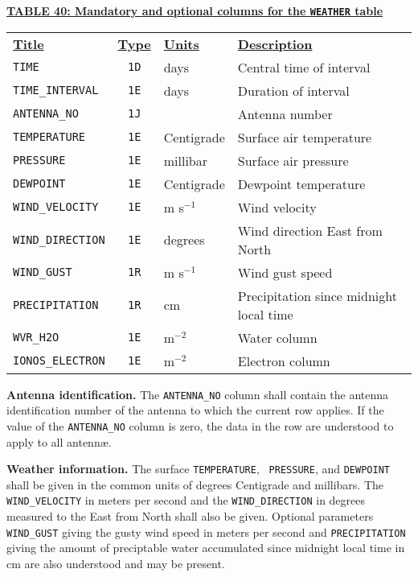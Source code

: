 \documentclass[twoside]{article}
\newcommand{\Me}[1]{\textcolor{mecol}{#1}}
\begin{document}
\begin{center}
\underline{\bf{TABLE 40: Mandatory \Me{and optional} columns for the
    {\tt WEATHER} table}}\\
\begin{tabular}{lcll}
\noalign{\vspace{2pt}}
\underline{{\bf Title\vphantom{y}}} & \underline{\bf{Type}} &
   \underline{{\bf Units\vphantom{y}}} & \underline{\bf{Description}} \\
\noalign{\vspace{2pt}}
{\tt TIME}        & {\tt 1D} & days  & Central time of interval \\
{\tt TIME\_INTERVAL} & {\tt 1E} & days & Duration of interval \\
{\tt ANTENNA\_NO} & {\tt 1J} &       & Antenna number \\
{\tt TEMPERATURE} & {\tt 1E} & Centigrade & Surface air temperature \\
{\tt PRESSURE}    & {\tt 1E} & millibar   & Surface air pressure \\
{\tt DEWPOINT}    & {\tt 1E} & Centigrade & Dewpoint temperature \\
{\tt WIND\_VELOCITY}  & {\tt 1E} & m s$^{-1}$ & Wind velocity \\
{\tt WIND\_DIRECTION} & {\tt 1E} & degrees & Wind direction East
                                             from North \\
\hline
\Me{{\tt WIND\_GUST}} & \Me{{\tt 1R}} & \Me{m s$^{-1}$} & \Me{Wind
  gust speed} \\
\Me{{\tt PRECIPITATION}} & \Me{{\tt 1R}} & \Me{cm} & \Me{Precipitation
  since midnight local time} \\
{\tt WVR\_H2O}        & {\tt 1E} & m$^{-2}$ & Water column \\
{\tt IONOS\_ELECTRON} & {\tt 1E} & m$^{-2}$ & Electron column
\end{tabular}
\end{center}

{\bf Antenna identification.}  The {\tt ANTENNA\_NO} column shall
contain the antenna identification number of the antenna to which the
current row applies.  If the value of the {\tt ANTENNA\_NO} column is
zero, the data in the row are understood to apply to all antenn\ae.

{\bf Weather information.}  The surface {\tt TEMPERATURE}, {\tt
  PRESSURE}, and {\tt DEWPOINT} shall be given in the common units of
degrees Centigrade and millibars.  The {\tt WIND\_VELOCITY} in meters
per second and the {\tt WIND\_DIRECTION} in degrees measured to the
East from North shall also be given.  \Me{Optional parameters {\tt
WIND\_GUST} giving the gusty wind speed in meters per second and
{\tt PRECIPITATION} giving the amount of preciptable water accumulated
since midnight local time in cm are also understood and may be
present.}
\end{document}
